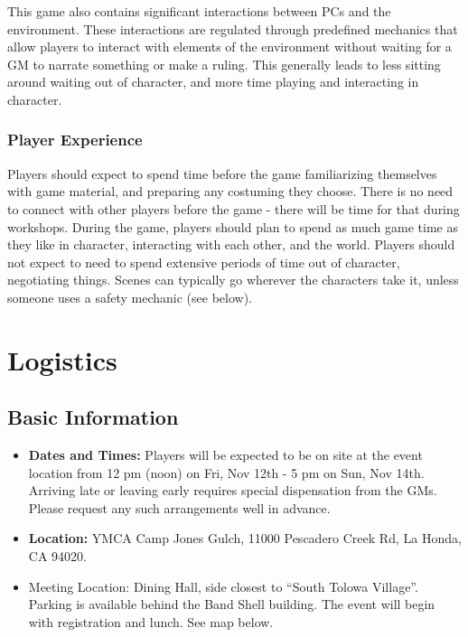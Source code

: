 \documentclass[sheet]{GL2020}
\begin{document}
This game also contains significant interactions between PCs and the environment. These interactions are regulated through predefined mechanics that allow players to interact with elements of the environment without waiting for a GM to narrate something or make a ruling. This generally leads to less sitting around waiting out of character, and more time playing and interacting in character. 

\subsubsection{Player Experience}
Players should expect to spend time before the game familiarizing themselves with game material, and preparing any costuming they choose. There is no need to connect with other players before the game - there will be time for that during workshops. During the game, players should plan to spend as much game time as they like in character, interacting with each other, and the world. Players should not expect to need to spend extensive periods of time out of character, negotiating things. Scenes can typically go wherever the characters take it, unless someone uses a safety mechanic (see below).


\section{Logistics}
\subsection{Basic Information}
\begin{itemize}
  \item \textbf{Dates and Times:} Players will be expected to be on site at the event location from 12 pm (noon) on Fri, Nov 12th - 5 pm on Sun, Nov 14th. Arriving late or leaving early requires special dispensation from the GMs. Please request any such arrangements well in advance.
  \item \textbf{Location:} YMCA Camp Jones Gulch, 11000 Pescadero Creek Rd, La Honda, CA 94020.
  \item Meeting Location: Dining Hall, side closest to ``South Tolowa Village''. Parking is available behind the Band Shell building. The event will begin with registration and lunch. See map below.
\end{itemize}
\end{document}
